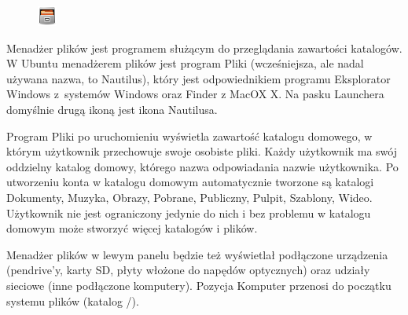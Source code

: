\begin{figure}
	\vspace{-10pt}
	\includegraphics[width=\linewidth]{images/ikony_pliki.png}
\end{figure}

Menadżer plików jest programem służącym do przeglądania zawartości katalogów. W Ubuntu menadżerem plików jest program  \textcolor{ubuntu_orange}{Pliki} (wcześniejsza, ale nadal używana nazwa, to \textcolor{ubuntu_orange}{Nautilus}), który jest odpowiednikiem programu \textcolor{ubuntu_orange}{Eksplorator Windows} z~systemów Windows oraz \textcolor{ubuntu_orange}{Finder} z MacOX X. Na pasku Launchera domyślnie drugą ikoną jest ikona Nautilusa. 

Program Pliki po uruchomieniu wyświetla zawartość katalogu domowego, w którym użytkownik przechowuje swoje osobiste pliki. Każdy użytkownik ma swój oddzielny katalog domowy, którego nazwa odpowiadania nazwie użytkownika. Po utworzeniu konta w katalogu domowym automatycznie tworzone są katalogi Dokumenty, Muzyka, Obrazy, Pobrane, Publiczny, Pulpit, Szablony, Wideo. Użytkownik nie jest ograniczony jedynie do nich i bez problemu w katalogu domowym może stworzyć więcej katalogów i plików.

Menadżer plików w lewym panelu będzie też wyświetlał podłączone urządzenia (pendrive'y, karty SD, płyty włożone do napędów optycznych) oraz udziały sieciowe (inne podłączone komputery). Pozycja \textcolor{ubuntu_orange}{Komputer} przenosi do początku systemu plików (katalog /).

